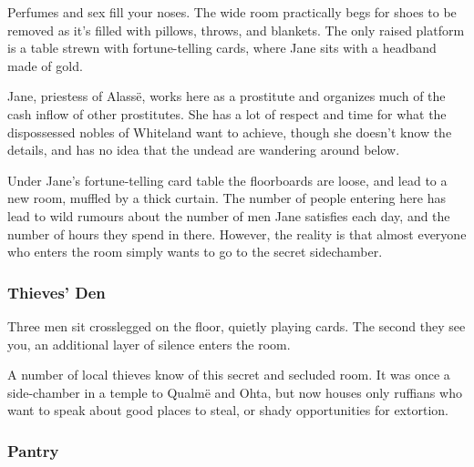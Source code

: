 \begin{boxtext}
	Perfumes and sex fill your noses.  The wide room practically begs for shoes to be removed as it's filled with pillows, throws, and blankets.  The only raised platform is a table strewn with fortune-telling cards, where Jane sits with a headband made of gold.
\end{boxtext}

Jane, priestess of Alass\"{e}, works here as a prostitute and organizes much of the cash inflow of other prostitutes.  She has a lot of respect and time for what the dispossessed nobles of Whiteland want to achieve, though she doesn't know the details, and has no idea that the undead are wandering around below.




Under Jane's fortune-telling card table the floorboards are loose, and lead to a new room, muffled by a thick curtain.  The number of people entering here has lead to wild rumours about the number of men Jane satisfies each day, and the number of hours they spend in there.  However, the reality is that almost everyone who enters the room simply wants to go to the secret sidechamber.


\subsubsection{Thieves' Den}


\begin{boxtext}
	Three men sit crosslegged on the floor, quietly playing cards.  The second they see you, an additional layer of silence enters the room.
\end{boxtext}

A number of local thieves know of this secret and secluded room.  It was once a side-chamber in a temple to Qualm\"{e} and Ohta, but now houses only ruffians who want to speak about good places to steal, or shady opportunities for extortion.


\humansoldier

\subsubsection{Pantry}

